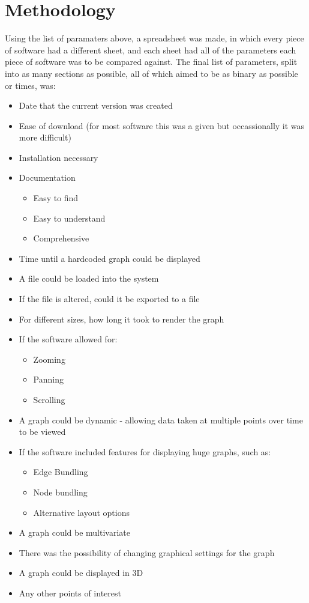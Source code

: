 \section{Methodology}
Using the list of paramaters above, a spreadsheet was made, in which every piece of software had a different sheet, and each sheet had all of the parameters each piece of software was to be compared against. The final list of parameters, split into as many sections as possible, all of which aimed to be as binary as possible or times, was:
\begin{itemize}
	\item Date that the current version was created
	\item Ease of download (for most software this was a given but occassionally it was more difficult)
	\item Installation necessary
	\item Documentation
	\begin{itemize}
		\item Easy to find
		\item Easy to understand
		\item Comprehensive
	\end{itemize}
	\item Time until a hardcoded graph could be displayed
	\item A file could be loaded into the system
	\item If the file is altered, could it be exported to a file
	\item For different sizes, how long it took to render the graph
	\item If the software allowed for:
	\begin{itemize}
		\item Zooming
		\item Panning
		\item Scrolling
	\end{itemize}
	\item A graph could be dynamic - allowing data taken at multiple points over time to be viewed
	\item If the software included features for displaying huge graphs, such as:
	\begin{itemize}
		\item Edge Bundling
		\item Node bundling
		\item Alternative layout options
	\end{itemize}
	\item A graph could be multivariate
	\item There was the possibility of changing graphical settings for the graph
	\item A graph could be displayed in 3D
	\item Any other points of interest
\end{itemize}

